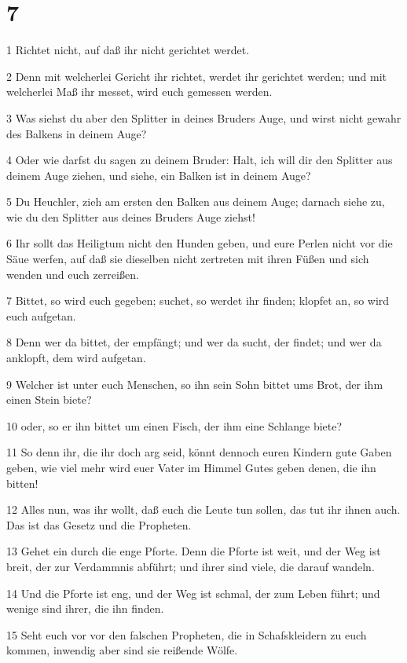 \chapter{7}

\par 1 Richtet nicht, auf daß ihr nicht gerichtet werdet.
\par 2 Denn mit welcherlei Gericht ihr richtet, werdet ihr gerichtet werden; und mit welcherlei Maß ihr messet, wird euch gemessen werden.
\par 3 Was siehst du aber den Splitter in deines Bruders Auge, und wirst nicht gewahr des Balkens in deinem Auge?
\par 4 Oder wie darfst du sagen zu deinem Bruder: Halt, ich will dir den Splitter aus deinem Auge ziehen, und siehe, ein Balken ist in deinem Auge?
\par 5 Du Heuchler, zieh am ersten den Balken aus deinem Auge; darnach siehe zu, wie du den Splitter aus deines Bruders Auge ziehst!
\par 6 Ihr sollt das Heiligtum nicht den Hunden geben, und eure Perlen nicht vor die Säue werfen, auf daß sie dieselben nicht zertreten mit ihren Füßen und sich wenden und euch zerreißen.
\par 7 Bittet, so wird euch gegeben; suchet, so werdet ihr finden; klopfet an, so wird euch aufgetan.
\par 8 Denn wer da bittet, der empfängt; und wer da sucht, der findet; und wer da anklopft, dem wird aufgetan.
\par 9 Welcher ist unter euch Menschen, so ihn sein Sohn bittet ums Brot, der ihm einen Stein biete?
\par 10 oder, so er ihn bittet um einen Fisch, der ihm eine Schlange biete?
\par 11 So denn ihr, die ihr doch arg seid, könnt dennoch euren Kindern gute Gaben geben, wie viel mehr wird euer Vater im Himmel Gutes geben denen, die ihn bitten!
\par 12 Alles nun, was ihr wollt, daß euch die Leute tun sollen, das tut ihr ihnen auch. Das ist das Gesetz und die Propheten.
\par 13 Gehet ein durch die enge Pforte. Denn die Pforte ist weit, und der Weg ist breit, der zur Verdammnis abführt; und ihrer sind viele, die darauf wandeln.
\par 14 Und die Pforte ist eng, und der Weg ist schmal, der zum Leben führt; und wenige sind ihrer, die ihn finden.
\par 15 Seht euch vor vor den falschen Propheten, die in Schafskleidern zu euch kommen, inwendig aber sind sie reißende Wölfe.
